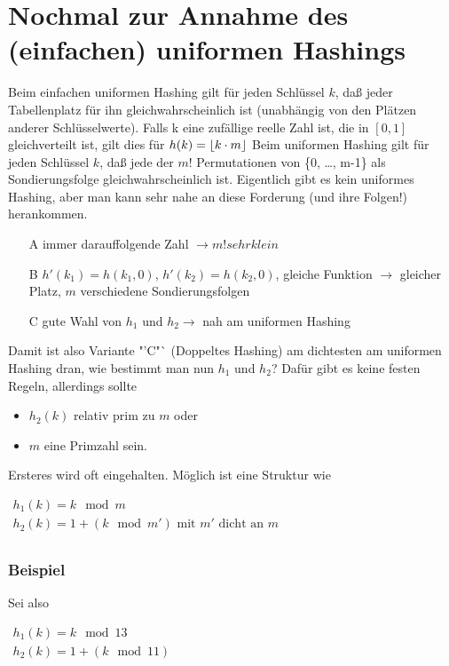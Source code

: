 \documentclass[ngerman,draft,parskip=half*,twoside]{scrreprt}
\theoremstyle{break}
\theoremstyle{nonumberbreak}
\DeclarePairedDelimiter{\floor}{\lfloor}{\rfloor}
\begin{document}
\section{Nochmal zur Annahme des (einfachen) uniformen Hashings}
Beim einfachen uniformen Hashing gilt für jeden Schlüssel $k$, daß jeder Tabellenplatz für ihn gleichwahrscheinlich
ist (unabhängig von den Plätzen anderer Schlüsselwerte). Falls k eine zufällige reelle Zahl ist, die in $[0, 1]$
gleichverteilt ist, gilt dies für $h(k)=\floor{ k \cdot m}$
Beim uniformen Hashing gilt für jeden Schlüssel $k$, daß jede der $m!$ Permutationen von \{0, \ldots, m-1\} als
Sondierungsfolge gleichwahrscheinlich ist. Eigentlich gibt es kein uniformes Hashing, aber man kann sehr nahe an diese
Forderung (und ihre Folgen!) herankommen.
\begin{itemize}
\item[A] immer darauffolgende Zahl $\rightarrow m! sehr klein$
\item[B] $h'(k_1)=h(k_1, 0)$, $h'(k_2)=h(k_2, 0)$, gleiche Funktion $\rightarrow$ gleicher Platz, $m$ verschiedene
Sondierungsfolgen 
\item[C] gute Wahl von $h_1$ und $h_2 \rightarrow$ nah am uniformen Hashing
\end{itemize}
Damit ist also Variante "'C"` (Doppeltes Hashing) am dichtesten am uniformen Hashing dran, wie bestimmt man nun $h_1$
und $h_2$?
Dafür gibt es keine festen Regeln, allerdings sollte
\begin{itemize}
\item $h_2(k)$ relativ prim zu $m$ oder
\item $m$ eine Primzahl sein.
\end{itemize}
Ersteres wird oft eingehalten. Möglich ist eine Struktur wie 

$\begin{array}{l}
h_1(k)= k \mod m\\
h_2(k)= 1 + (k \mod m')  \mbox{ mit } m' \mbox{ dicht an } m\\
\end{array}$

\subsubsection{Beispiel}
Sei also 

$\begin{array}{l}
h_1(k)= k \mod 13\\
h_2(k)= 1 + (k \mod 11)\\
\end{array}$
\end{document}
